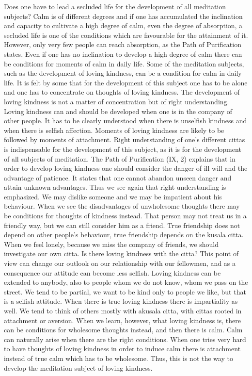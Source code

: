 \documentclass{book}
\begin{document}
Does one have to lead a secluded life for the development of all
meditation subjects? Calm is of different degrees and if one has
accumulated the inclination and capacity to cultivate a high degree of
calm, even the degree of absorption, a secluded life is one of the
conditions which are favourable for the attainment of it. However, only
very few people can reach absorption, as the Path of Purification
states. Even if one has no inclination to develop a high degree of calm
there can be conditions for moments of calm in daily life. Some of the
meditation subjects, such as the development of loving kindness, can be
a condition for calm in daily life. It is felt by some that for the
development of this subject one has to be alone and one has to
concentrate on thoughts of loving kindness. The development of
loving kindness is not a matter of concentration but of right
understanding. Loving kindness can and should be developed when one is
in the company of other people. It has to be clearly understood when
there is unselfish kindness and when there is selfish affection. Moments
of loving kindness are likely to be followed by moments of attachment.
Right understanding of one's different cittas is indispensable for the
development of this subject, as it is for the development of all
subjects of meditation. The Path of Purification (IX, 2) explains that
in order to develop loving kindness one should consider the danger of
ill will and the advantage of patience. It states that one cannot
abandon unseen danger and attain unknown advantages. Thus we see again
that right understanding is emphasized. We may dislike someone and we
may be impatient about his behaviour. When we see the disadvantages of
unwholesome thoughts there may be conditions for thoughts of kindness
instead. That person may not treat us in a friendly way, but we can
still consider him as a friend. True friendship does not depend on other
people's behaviour, true friendship depends on the kusala citta. When we
feel lonely, because we miss the company of friends, we should
investigate our own citta. Is there loving kindness with the citta? This
point of view can change our outlook on our relationship with our
fellow­men, and as a consequence our attitude can become less selfish.
Loving kindness can be extended to anybody, also to people whom we do
not know, whom we pass on the street. We tend to be partial, we want to
be kind only to people we like, but that is a selfish attitude. When
there is true loving kindness there is impartiality as well. We tend to
think of others mostly with akusala citta, with cittas rooted in
attachment or aversion. When we learn, however, what loving kindness is,
there can be conditions for whole­some thoughts instead, and then there
is calm. Calm can naturally arise when there are the right conditions.
When one tries very hard to have thoughts of loving kindness in order to
induce calm there is attachment instead of true calm which has to be
wholesome. Thus, this is not the way to develop the meditation subject
of loving kindness.
\end{document}
